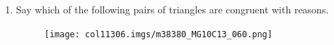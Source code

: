\begin{table}[H]
\begin{enumerate}[noitemsep, label=\textbf{\arabic*}. ]
        
        
\label{m38380*uid126}\item Say which of the following pairs of triangles are congruent with reasons.
    \setcounter{subfigure}{0}


	\begin{figure}[H] %
    \begin{center}
    \label{m38380*id320512!!!underscore!!!media}\label{m38380*id320512!!!underscore!!!printimage}\texttt{[image: col11306.imgs/m38380\_MG10C13\_060.png]} %
        
      \vspace{2pt}
    \vspace{.1in}
    
    \end{center}

 \end{figure}   

    \addtocounter{footnote}{-0}


        
    




        

\end{enumerate}
\end{table}
